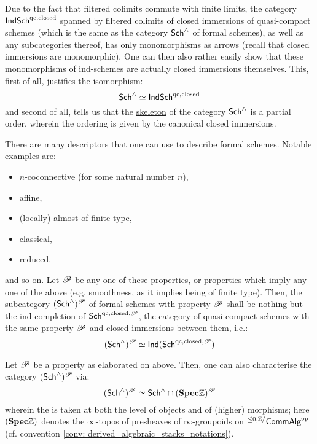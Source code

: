                 \begin{remark} \label{remark: morphisms_of_formal_schemes}
                    Due to the fact that filtered colimits commute with finite limits, the category $\mathsf{Ind}\mathsf{Sch}^{\mathrm{qc}, \mathrm{closed}}$ spanned by filtered colimits of closed immersions of quasi-compact schemes (which is the same as the category $\mathsf{Sch}^{\wedge}$ of formal schemes), as well as any subcategories thereof, has only monomorphisms as arrows (recall that closed immersions are monomorphic). One can then also rather easily show that these monomorphisms of ind-schemes are actually closed immersions themselves. This, first of all, justifies the isomorphism:
                        $$\mathsf{Sch}^{\wedge} \simeq \mathsf{Ind}\mathsf{Sch}^{\mathrm{qc}, \mathrm{closed}}$$
                    and second of all, tells us that the \href{https://ncatlab.org/nlab/show/skeleton}{\underline{skeleton}} of the category $\mathsf{Sch}^{\wedge}$ is a partial order, wherein the ordering is given by the canonical closed immersions. 
                \end{remark}
                
                \begin{definition} \label{def: formal_schemes_descriptors}
                    There are many descriptors that one can use to describe formal schemes. Notable examples are:
                        \begin{itemize}
                            \item $n$-coconnective (for some natural number $n$),
                            \item affine,
                            \item (locally) almost of finite type,
                            \item classical,
                            \item reduced.
                        \end{itemize}
                    and so on. Let $\mathscr{P}$ be any one of these properties, or properties which imply any one of the above (e.g. smoothness, as it implies being of finite type). Then, the subcategory $(\mathsf{Sch}^{\wedge})^{\mathscr{P}}$ of formal schemes with property $\mathscr{P}$ shall be nothing but the ind-completion of $\mathsf{Sch}^{\mathrm{qc}, \mathrm{closed}, \mathscr{P}}$, the category of quasi-compact schemes with the same property $\mathscr{P}$ and closed immersions between them, i.e.:
                        $$(\mathsf{Sch}^{\wedge})^{\mathscr{P}} \simeq \mathsf{Ind}(\mathsf{Sch}^{\mathrm{qc}, \mathrm{closed}, \mathscr{P}})$$
                \end{definition}
                \begin{remark}
                    Let $\mathscr{P}$ be a property as elaborated on above. Then, one can also characterise the category $(\mathsf{Sch}^{\wedge})^{\mathscr{P}}$ via:
                        $$(\mathsf{Sch}^{\wedge})^{\mathscr{P}} \simeq \mathsf{Sch}^{\wedge} \cap (\mathbf{Spec} \mathbb{Z})^{\mathscr{P}}$$
                    wherein the  is taken at both the level of objects and of (higher) morphisms; here $(\mathbf{Spec} \mathbb{Z})$ denotes the $\infty$-topos of presheaves of $\infty$-groupoids on ${}^{\leq 0, \mathbb{Z}/}\mathsf{Comm}\mathsf{Alg}^{\mathrm{op}}$ (cf. convention \ref{conv: derived_algebraic_stacks_notations}). 
                \end{remark}
                
